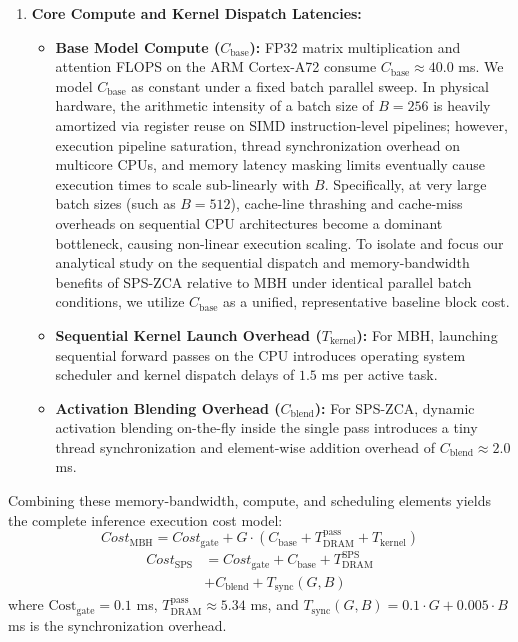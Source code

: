 \begin{enumerate}
    \item \textbf{Core Compute and Kernel Dispatch Latencies:} 
    \begin{itemize}
        \item \textbf{Base Model Compute ($C_{\text{base}}$):} FP32 matrix multiplication and attention FLOPS on the ARM Cortex-A72 consume $C_{\text{base}} \approx 40.0$ ms.
We model $C_{\text{base}}$ as constant under a fixed batch parallel sweep.
In physical hardware, the arithmetic intensity of a batch size of $B=256$ is heavily amortized via register reuse on SIMD instruction-level pipelines; however, execution pipeline saturation, thread synchronization overhead on multicore CPUs, and memory latency masking limits eventually cause execution times to scale sub-linearly with $B$.
Specifically, at very large batch sizes (such as $B=512$), cache-line thrashing and cache-miss overheads on sequential CPU architectures become a dominant bottleneck, causing non-linear execution scaling.
To isolate and focus our analytical study on the sequential dispatch and memory-bandwidth benefits of SPS-ZCA relative to MBH under identical parallel batch conditions, we utilize $C_{\text{base}}$ as a unified, representative baseline block cost.

        \item \textbf{Sequential Kernel Launch Overhead ($T_{\text{kernel}}$):} For MBH, launching sequential forward passes on the CPU introduces operating system scheduler and kernel dispatch delays of $1.5$ ms per active task.
        \item \textbf{Activation Blending Overhead ($C_{\text{blend}}$):} For SPS-ZCA, dynamic activation blending on-the-fly inside the single pass introduces a tiny thread synchronization and element-wise addition overhead of $C_{\text{blend}} \approx 2.0$ ms.
    \end{itemize}
\end{enumerate}

Combining these memory-bandwidth, compute, and scheduling elements yields the complete inference execution cost model:
\begin{equation}
    Cost_{\text{MBH}} = Cost_{\text{gate}} + G \cdot (C_{\text{base}} + T_{\text{DRAM}}^{\text{pass}} + T_{\text{kernel}})
\end{equation}
\begin{equation}
\begin{aligned}
    Cost_{\text{SPS}} &= Cost_{\text{gate}} + C_{\text{base}} + T_{\text{DRAM}}^{\text{SPS}} \\
    &+ C_{\text{blend}} + T_{\text{sync}}(G, B)
\end{aligned}
\end{equation}
where $\text{Cost}_{\text{gate}} = 0.1$ ms, $T_{\text{DRAM}}^{\text{pass}} \approx 5.34$ ms, and $T_{\text{sync}}(G, B) = 0.1 \cdot G + 0.005 \cdot B$ ms is the synchronization overhead.

